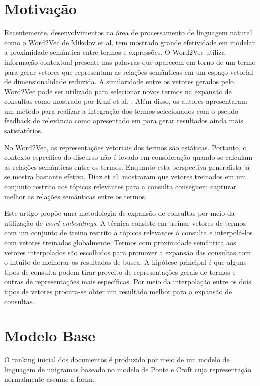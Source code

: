 \documentclass{article}
\begin{document}
\section{Motivação}

Recentemente, desenvolvimentos na área de processamento de linguagem natural como o Word2Vec de Mikolov et al. 
\cite{mikolov2013} tem mostrado grande efetividade em modelar a proximidade semântica entre termos e expressões.
O Word2Vec utiliza informação contextual presente nas palavras que aparecem em torno de um termo para gerar
vetores que representam as relações semânticas em um espaço vetorial de dimensionalidade reduzida. A similaridade
entre os vetores gerados pelo Word2Vec pode ser utilizada para selecionar novos termos na expansão 
de consultas como mostrado por Kuzi et al. \cite{kuzi2016}. Além disso, os autores apresentaram um método para
realizar a integração dos termos selecionados com o pseudo feedback de relevância como apresentado em \cite{lavrenko2001}
para gerar resultados ainda mais satisfatórios.

No Word2Vec, as representações vetoriais dos termos são estáticas. Portanto, o contexto específico do discurso não é levado
em consideração quando se calculam as relações semânticas entre os termos. Enquanto esta perspectiva generalista
já se mostra bastante efetiva, Diaz et al. \cite{diaz2016} mostraram que vetores treinados em um conjunto restrito 
aos tópicos relevantes para a consulta conseguem capturar melhor as relações semânticas entre os termos.

Este artigo propõe uma metodologia de expansão de consultas por meio da utilização de \textit{word embeddings}. 
A técnica consiste em treinar vetores de termos com um conjunto de treino restrito à tópicos
relevantes à consulta e interpolá-los com vetores treinados globalmente. Termos com proximidade semântica 
aos vetores interpolados são escolhidos para promover a expansão das consultas com o intuito de melhorar os resultados 
de busca. A hipótese principal é que alguns tipos de consulta podem tirar proveito
de representações gerais de termos e outras de representações mais específicas. Por meio da interpolação entre os dois 
tipos de vetores procura-se obter um resultado melhor para a expansão de consultas.

\section{Modelo Base}

O ranking inicial dos documentos é produzido por meio de um modelo de linguagem de unigramas baseado no modelo de 
Ponte e Croft \cite{ponte1998} cuja representação normalmente assume a forma:
\end{document}
